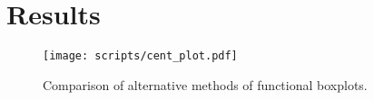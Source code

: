 \documentclass[12pt]{article}
\theoremstyle{definition} %
\begin{document}
\section{Results}

\begin{figure}[h!]
\centering
\texttt{[image: scripts/cent\_plot.pdf]}
\caption{Comparison of alternative methods of functional boxplots.}\label{p.a}
\end{figure}



\end{document}

